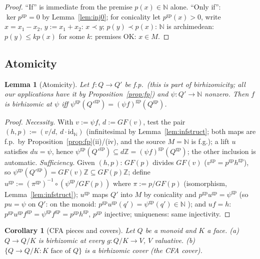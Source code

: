 \documentclass[11pt]{article}
\newtheorem{lemma}[theorem]{Lemma}
\newtheorem{corollary}[theorem]{Corollary}
\theoremstyle{definition}
\newcommand{\gp}{\mathrm{gp}}
\newcommand{\Z}{\mathbb{Z}}
\begin{document}
\begin{proof}
``If'' is immediate from the premise $p(x)\in\mathbb N$ alone. ``Only
if'': $\ker p^{\gp}=0$ by Lemma~\ref{lem:inj0}; for conicality let
$p^{\gp}(x)>0$, write $x=x_1-x_2$, $y:=x_1+x_2$: $x\prec y$;
$p(y)\prec p(x)$: $\mathbb N$ is archimedean: $p(y)\le kp(x)$ for
some $k$: premises OK: $x\in M$.
\end{proof}

\subsection{Atomicity}

\begin{lemma}[Atomicity]\label{lem:atomic}
Let $f:Q\to Q'$ be f.p.\ \textup{(}this is part of birhizomicity;
all our applications have it by
Proposition~\ref{prop:fp}\textup{)} and
$\psi:Q'\to\mathbb N$ nonzero. Then $f$
is birhizomic at $\psi$ iff
$\psi^{\gp}(Q'^{\gp})=(\psi f)^{\gp}(Q^{\gp})$.
\end{lemma}

\begin{proof}
\emph{Necessity.} With $v:=\psi f$, $d:={GF}(v)$, test the pair
$(h,p):=(v/d,\ d\cdot\mathrm{id}_{\mathbb N})$
\textup{(}infinitesimal by Lemma~\ref{lem:infstruct}; both maps
are f.p.\ by Proposition~\ref{prop:fp}(ii)/(iv), and the source
$M=\mathbb N$ is f.g.\textup{)}; a lift $u$ satisfies $du=\psi$, hence
$\psi^{\gp}(Q'^{\gp})\subseteq d\Z=(\psi f)^{\gp}(Q^{\gp})$; the
other inclusion is automatic.
\emph{Sufficiency.} Given $(h,p)$: ${GF}(p)$ divides ${GF}(v)$
($v^{\gp}=p^{\gp}h^{\gp}$), so $\psi^{\gp}(Q'^{\gp})
={GF}(v)\Z\subseteq{GF}(p)\Z$; define
$u^{\gp}:=(\pi^{\gp})^{-1}\circ(\psi^{\gp}/{GF}(p))$ where
$\pi:=p/{GF}(p)$ (isomorphism, Lemma~\ref{lem:infstruct});
$u^{\gp}$ maps $Q'$ into $M$ by conicality and
$p^{\gp}u^{\gp}=\psi^{\gp}$ (so $pu=\psi$ on $Q'$: on the monoid:
$p^{\gp}u^{\gp}(q')=\psi^{\gp}(q')\in\mathbb N$ \checkmark); and
$uf=h$: $p^{\gp}u^{\gp}f^{\gp}=\psi^{\gp}f^{\gp}=p^{\gp}h^{\gp}$,
$p^{\gp}$ injective; uniqueness: same injectivity.
\end{proof}

\begin{corollary}[CFA pieces and covers]\label{cor:cfa}
Let $Q$ be a monoid and $K$ a face.
\textup{(}a\textup{)} $Q\to Q/K$ is birhizomic at every
$g:Q/K\to V$, $V$ valuative.
\textup{(}b\textup{)} $\{Q\to Q/K:K\text{ face of }Q\}$ is a
birhizomic cover \textup{(}the \emph{CFA cover}\textup{)}.
\end{corollary}
\end{document}
